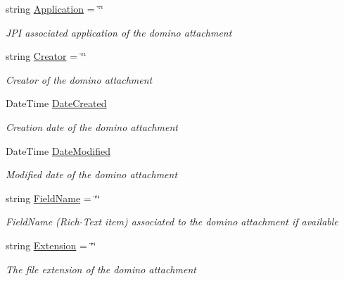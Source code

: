 \begin{DoxyCompactItemize}
string \mbox{\hyperlink{class_file_object_a39640cdc4b16ee66e9c73803f4510396}{Application}} = \char`\"{}\char`\"{}
\begin{DoxyCompactList}\small\item\em J\+PI associated application of the domino attachment \end{DoxyCompactList}\item 
string \mbox{\hyperlink{class_file_object_a1ab7d29c80841b60b276b7430f4e5ec7}{Creator}} = \char`\"{}\char`\"{}
\begin{DoxyCompactList}\small\item\em Creator of the domino attachment \end{DoxyCompactList}\item 
Date\+Time \mbox{\hyperlink{class_file_object_a372b9a7dad068368526b0698550f9504}{Date\+Created}}
\begin{DoxyCompactList}\small\item\em Creation date of the domino attachment \end{DoxyCompactList}\item 
Date\+Time \mbox{\hyperlink{class_file_object_a9a4c52e205bee3f8bdfa7040f465b6af}{Date\+Modified}}
\begin{DoxyCompactList}\small\item\em Modified date of the domino attachment \end{DoxyCompactList}\item 
string \mbox{\hyperlink{class_file_object_a26fa0ac628fee2387b7f89c78f93842e}{Field\+Name}} = \char`\"{}\char`\"{}
\begin{DoxyCompactList}\small\item\em Field\+Name (Rich-\/\+Text item) associated to the domino attachment if available \end{DoxyCompactList}\item 
string \mbox{\hyperlink{class_file_object_ae25b58dc19def323da91a48e17ba13ed}{Extension}} = \char`\"{}\char`\"{}
\begin{DoxyCompactList}\small\item\em The file extension of the domino attachment \end{DoxyCompactList}\item 

\end{DoxyCompactItemize}
